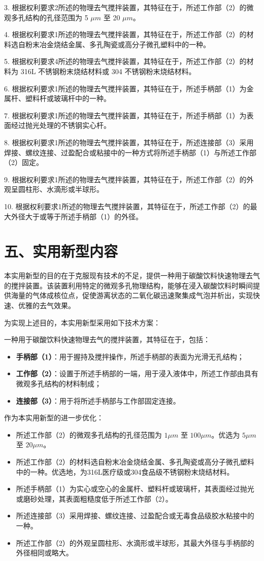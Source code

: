 \documentclass[a4paper,12pt]{ctexart}
\begin{document}
3. 根据权利要求2所述的物理去气搅拌装置，其特征在于，所述工作部（2）的微观多孔结构的孔径范围为 5 $\mu m$ 至 20 $\mu m$。

4. 根据权利要求1所述的物理去气搅拌装置，其特征在于，所述工作部（2）的材料选自粉末冶金烧结金属、多孔陶瓷或高分子微孔塑料中的一种。

5. 根据权利要求4所述的物理去气搅拌装置，其特征在于，所述工作部（2）的材料为 316L 不锈钢粉末烧结材料或 304 不锈钢粉末烧结材料。

6. 根据权利要求1所述的物理去气搅拌装置，其特征在于，所述手柄部（1）为金属杆、塑料杆或玻璃杆中的一种。

7. 根据权利要求1所述的物理去气搅拌装置，其特征在于，所述手柄部（1）为表面经过抛光处理的不锈钢实心杆。

8. 根据权利要求1所述的物理去气搅拌装置，其特征在于，所述连接部（3）采用焊接、螺纹连接、过盈配合或粘接中的一种方式将所述手柄部（1）与所述工作部（2）固定。

9. 根据权利要求1所述的物理去气搅拌装置，其特征在于，所述工作部（2）的外观呈圆柱形、水滴形或半球形。

10. 根据权利要求1所述的物理去气搅拌装置，其特征在于，所述工作部（2）的最大外径大于或等于所述手柄部（1）的外径。

\section*{五、实用新型内容}
本实用新型的目的在于克服现有技术的不足，提供一种用于碳酸饮料快速物理去气的搅拌装置。该装置利用特定的微观多孔物理结构，能够在浸入碳酸饮料时瞬间提供海量的气体成核位点，促使游离状态的二氧化碳迅速聚集成气泡并析出，实现快速、优雅的去气效果。

为实现上述目的，本实用新型采用如下技术方案：

一种用于碳酸饮料快速物理去气的搅拌装置，其特征在于，包括：
\begin{itemize}
    \item \textbf{手柄部（1）}：用于握持及搅拌操作，所述手柄部的表面为光滑无孔结构；
    \item \textbf{工作部（2）}：设置于所述手柄部的一端，用于浸入液体中，所述工作部由具有微观多孔结构的材料制成；
    \item \textbf{连接部（3）}：用于将所述手柄部与工作部固定连接。
\end{itemize}

作为本实用新型的进一步优化：
\begin{itemize}
    \item 所述工作部（2）的微观多孔结构的孔径范围为 $1\mu m$ 至 $100\mu m$。优选为 $5\mu m$ 至 $20\mu m$。
    \item 所述工作部（2）的材料选自粉末冶金烧结金属、多孔陶瓷或高分子微孔塑料中的一种。优选地，为316L医疗级或304食品级不锈钢粉末烧结材料。
    \item 所述手柄部（1）为实心或空心的金属杆、塑料杆或玻璃杆，其表面经过抛光或磨砂处理，其表面粗糙度低于所述工作部（2）。
    \item 所述连接部（3）采用焊接、螺纹连接、过盈配合或无毒食品级胶水粘接中的一种。
    \item 所述工作部（2）的外观呈圆柱形、水滴形或半球形，其最大外径与手柄部的外径相同或略大。
\end{itemize}
\end{document}
